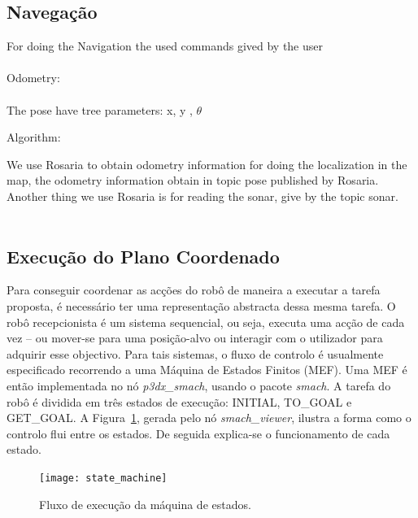 \documentclass[journal]{IEEEtran}
\begin{document}
\subsection{Navegação}


	For doing the Navigation the used commands gived by the user
	\\
	\\
	Odometry:
	\\
	\\
	The pose have tree parameters: x, y , $\theta$




	Algorithm:







	We use Rosaria to obtain odometry information for doing the localization in the map, the odometry information obtain in topic pose published by Rosaria.
	Another thing we use Rosaria is for reading the sonar, give by the topic sonar.
	\\
	\\

\subsection{Execução do Plano Coordenado}

Para conseguir coordenar as acções do robô de maneira a executar a tarefa proposta, é necessário ter uma representação abstracta dessa mesma tarefa. O robô recepcionista é um sistema sequencial, ou seja, executa uma acção de cada vez -- ou mover-se para uma posição-alvo ou interagir com o utilizador para adquirir esse objectivo. Para tais sistemas, o fluxo de controlo é usualmente especificado recorrendo a uma Máquina de Estados Finitos (MEF).
Uma MEF é então implementada no nó \textit{p3dx\_smach}, usando o pacote \textit{smach}. A tarefa do robô é dividida em três estados de execução: INITIAL, TO\_GOAL e GET\_GOAL. A Figura~\ref{fig: maquina_estados}, gerada pelo nó \textit{smach\_viewer}, ilustra a forma como o controlo flui entre os estados. De seguida explica-se o funcionamento de cada estado.

\begin{figure}[ht]
	\centering
	\texttt{[image: state\_machine]}
	\caption{Fluxo de execução da máquina de estados.}
	\label{fig: maquina_estados}
\end{figure}
\end{document}

